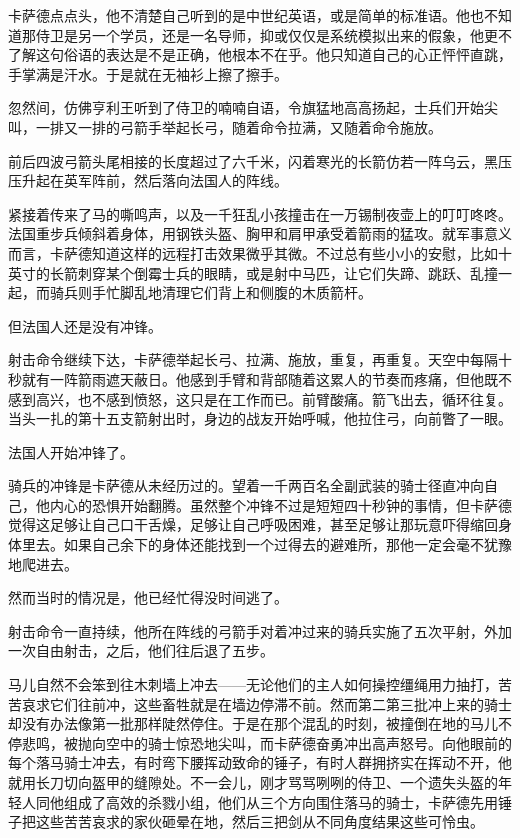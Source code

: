 \documentclass[AutoFakeBold=true]{book}
\begin{document}
卡萨德点点头，他不清楚自己听到的是中世纪英语，或是简单的标准语。他也不知道那侍卫是另一个学员，还是一名导师，抑或仅仅是系统模拟出来的假象，他更不了解这句俗语的表达是不是正确，他根本不在乎。他只知道自己的心正怦怦直跳，手掌满是汗水。于是就在无袖衫上擦了擦手。

忽然间，仿佛亨利王听到了侍卫的喃喃自语，令旗猛地高高扬起，士兵们开始尖叫，一排又一排的弓箭手举起长弓，随着命令拉满，又随着命令施放。

前后四波弓箭头尾相接的长度超过了六千米，闪着寒光的长箭仿若一阵乌云，黑压压升起在英军阵前，然后落向法国人的阵线。

紧接着传来了马的嘶鸣声，以及一千狂乱小孩撞击在一万锡制夜壶上的叮叮咚咚。法国重步兵倾斜着身体，用钢铁头盔、胸甲和肩甲承受着箭雨的猛攻。就军事意义而言，卡萨德知道这样的远程打击效果微乎其微。不过总有些小小的安慰，比如十英寸的长箭刺穿某个倒霉士兵的眼睛，或是射中马匹，让它们失蹄、跳跃、乱撞一起，而骑兵则手忙脚乱地清理它们背上和侧腹的木质箭杆。

但法国人还是没有冲锋。

射击命令继续下达，卡萨德举起长弓、拉满、施放，重复，再重复。天空中每隔十秒就有一阵箭雨遮天蔽日。他感到手臂和背部随着这累人的节奏而疼痛，但他既不感到高兴，也不感到愤怒，这只是在工作而已。前臂酸痛。箭飞出去，循环往复。当头一扎的第十五支箭射出时，身边的战友开始呼喊，他拉住弓，向前瞥了一眼。

法国人开始冲锋了。

骑兵的冲锋是卡萨德从未经历过的。望着一千两百名全副武装的骑士径直冲向自己，他内心的恐惧开始翻腾。虽然整个冲锋不过是短短四十秒钟的事情，但卡萨德觉得这足够让自己口干舌燥，足够让自己呼吸困难，甚至足够让那玩意吓得缩回身体里去。如果自己余下的身体还能找到一个过得去的避难所，那他一定会毫不犹豫地爬进去。

然而当时的情况是，他已经忙得没时间逃了。

射击命令一直持续，他所在阵线的弓箭手对着冲过来的骑兵实施了五次平射，外加一次自由射击，之后，他们往后退了五步。

马儿自然不会笨到往木刺墙上冲去——无论他们的主人如何操控缰绳用力抽打，苦苦哀求它们往前冲，这些畜牲就是在墙边停滞不前。然而第二第三批冲上来的骑士却没有办法像第一批那样陡然停住。于是在那个混乱的时刻，被撞倒在地的马儿不停悲鸣，被抛向空中的骑士惊恐地尖叫，而卡萨德奋勇冲出高声怒号。向他眼前的每个落马骑士冲去，有时弯下腰挥动致命的锤子，有时人群拥挤实在挥动不开，他就用长刀切向盔甲的缝隙处。不一会儿，刚才骂骂咧咧的侍卫、一个遗失头盔的年轻人同他组成了高效的杀戮小组，他们从三个方向围住落马的骑士，卡萨德先用锤子把这些苦苦哀求的家伙砸晕在地，然后三把剑从不同角度结果这些可怜虫。
\end{document}
